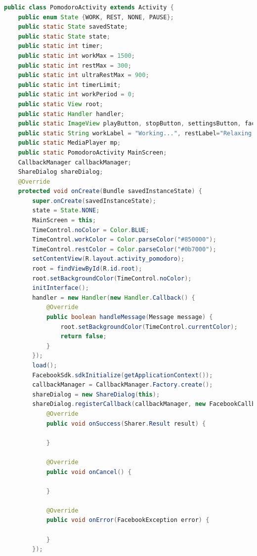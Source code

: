 \documentclass[12pt]{article}
\begin{document}
\begin{lstlisting}[language=java, caption={Fisierul PomodoroActivity.java}, label=list2]
public class PomodoroActivity extends Activity {
    public enum State {WORK, REST, NONE, PAUSE};
    public static State savedState;
    public static State state;
    public static int timer;
    public static int workMax = 1500;
    public static int restMax = 300;
    public static int ultraRestMax = 900;
    public static int timerLimit;
    public static int workPeriod = 0;
    public static View root;
    public static Handler handler;
    public static ImageView playButton, stopButton, settingsButton, facebookButton;
    public static String workLabel = "Working...", restLabel="Relaxing...", noLabel="Press play to start", pauseLabel="Paused..";
    public static MediaPlayer mp;
    public static PomodoroActivity MainScreen;
    CallbackManager callbackManager;
    ShareDialog shareDialog;
    @Override
    protected void onCreate(Bundle savedInstanceState) {
        super.onCreate(savedInstanceState);
        state = State.NONE;
        MainScreen = this;
        TimeControl.noColor = Color.BLUE;
        TimeControl.workColor = Color.parseColor("#850000");
        TimeControl.restColor = Color.parseColor("#0b7000");
        setContentView(R.layout.activity_pomodoro);
        root = findViewById(R.id.root);
        root.setBackgroundColor(TimeControl.noColor);
        initInterface();
        handler = new Handler(new Handler.Callback() {
            @Override
            public boolean handleMessage(Message message) {
                root.setBackgroundColor(TimeControl.currentColor);
                return false;
            }
        });
        load();
        FacebookSdk.sdkInitialize(getApplicationContext());
        callbackManager = CallbackManager.Factory.create();
        shareDialog = new ShareDialog(this);
        shareDialog.registerCallback(callbackManager, new FacebookCallback<Sharer.Result>() {
            @Override
            public void onSuccess(Sharer.Result result) {

            }

            @Override
            public void onCancel() {

            }

            @Override
            public void onError(FacebookException error) {

            }
        });


\end{lstlisting}
\end{document}
